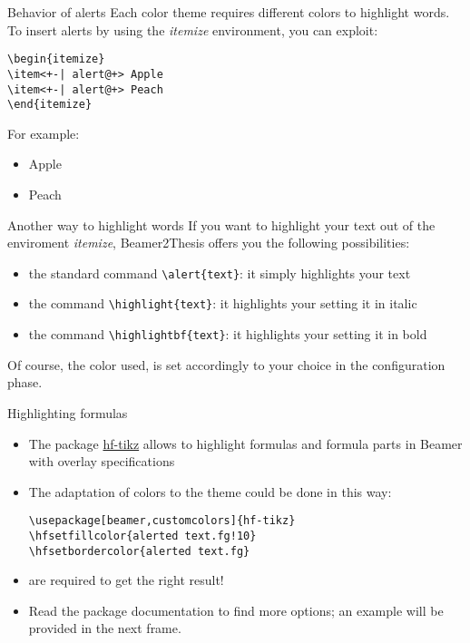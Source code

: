\documentclass{beamer}
\begin{document}
\begin{frame}[fragile]{Behavior of alerts}
Each color theme requires different colors to highlight words. To insert alerts by using the \emph{itemize} environment, you can exploit:
\begin{verbatim}
\begin{itemize}
\item<+-| alert@+> Apple
\item<+-| alert@+> Peach
\end{itemize}
\end{verbatim}
For example:
\begin{itemize}
\item<+-| alert@+> Apple
\item<+-| alert@+> Peach
\end{itemize}
\end{frame}

\begin{frame}[fragile]{Another way to highlight words}
If you want to highlight your text out of the enviroment \emph{itemize}, Beamer2Thesis offers you the following possibilities:
\begin{itemize}
\item the standard command \verb!\alert{text}!: it simply highlights your \alert{text}
\item the command \verb!\highlight{text}!: it highlights your  setting it in italic
\item the command \verb!\highlightbf{text}!: it highlights your  setting it in bold
\end{itemize}
Of course, the color used, is set accordingly to your choice in the configuration phase.
\end{frame}

\begin{frame}[fragile]{Highlighting formulas}
\begin{itemize}
\item The package \href{http://www.ctan.org/pkg/hf-tikz}{hf-tikz} allows to highlight formulas and formula parts in Beamer with overlay specifications 
\item The adaptation of colors to the theme could be done in this way:
\begin{verbatim}
\usepackage[beamer,customcolors]{hf-tikz}
\hfsetfillcolor{alerted text.fg!10}
\hfsetbordercolor{alerted text.fg}
\end{verbatim}
\item {} are required to get the right result!
\item Read the package documentation to find more options; an example will be provided in the next frame.
\end{itemize}
\end{frame}
\end{document}
